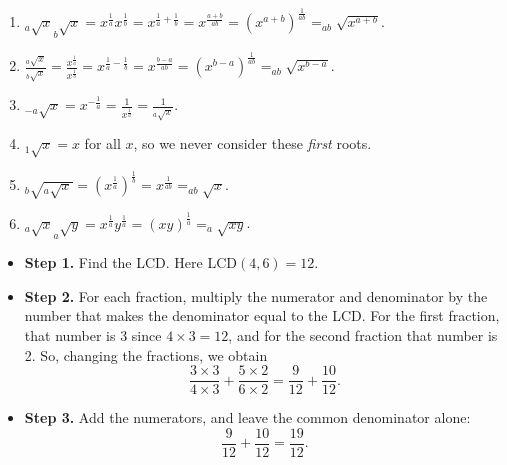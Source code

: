 \begin{enumerate}
\item $_a\sqrt{x}_b\sqrt{x}=x^{\frac{1}{a}}x^{\frac{1}{b}}=x^{\frac{1}{a}+\frac{1}{b}}=x^{\frac{a+b}{ab}}=({x^{a+b}})^{\frac{1}{ab}}=_{ab}\sqrt{x^{a+b}}.$\\[4pt]
\item $\frac{_a\sqrt{x}}{_b\sqrt{x}}=\frac{x^{\frac{1}{a}}}{x^{\frac{1}{b}}}=x^{\frac{1}{a}-\frac{1}{b}}=x^{\frac{b-a}{ab}}=({x^{b-a}})^{\frac{1}{ab}}=_{ab}\sqrt{x^{b-a}}.$\\[4pt]
\item $_{-a}\sqrt{x}=x^{-\frac{1}{a}}=\frac{1}{x^{\frac{1}{a}}}=\frac{1}{_a\sqrt{x}}.$\\[4pt]
\item $_1\sqrt{x}=x$ for all $x$, so we never consider these \textit{first} roots.\\[4pt]
\item $_b\sqrt{_a\sqrt{x}}=(x^\frac{1}{a})^\frac{1}{b}=x^{\frac{1}{ab}}=_{ab}\sqrt{x}$.\\[4pt]
\item $_a\sqrt{x}_a\sqrt{y}=x^{\frac{1}{a}}y^{\frac{1}{a}}=(xy)^{\frac{1}{a}}=_a\sqrt{xy}$.
\end{enumerate}

\begin{itemize}
\item \textbf{Step 1.} Find the LCD.  Here LCD$(4,6)=12$.
\item \textbf{Step 2.} For each fraction, multiply the numerator and denominator by the number that makes the denominator equal to the LCD.  For the first fraction, that number is 3 since $4\times3=12$, and for the second fraction that number is 2.  So, changing the fractions, we obtain
\begin{equation*}
\frac{3\times3}{4\times3}+\frac{5\times2}{6\times2}=\frac{9}{12}+\frac{10}{12}.
\end{equation*}
\item \textbf{Step 3.} Add the numerators, and leave the common denominator alone:
\begin{equation*}
\frac{9}{12}+\frac{10}{12}=\frac{19}{12}.
\end{equation*}
\end{itemize}

